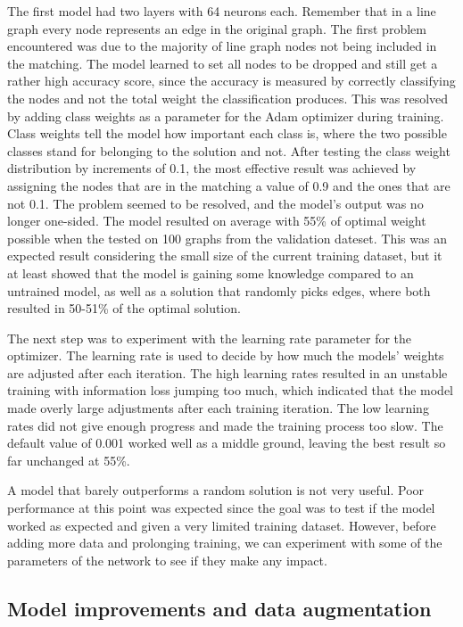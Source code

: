 The first model had two layers with 64 neurons each. Remember that in a line graph every node represents an edge in the original graph. The first problem encountered was due to the majority of line graph nodes not being included in the matching. The model learned to set all nodes to be dropped and still get a rather high accuracy score, since the accuracy is measured by correctly classifying the nodes and not the total weight the classification produces. This was resolved by adding class weights as a parameter for the Adam optimizer during training. Class weights tell the model how important each class is, where the two possible classes stand for belonging to the solution and not. After testing the class weight distribution by increments of 0.1, the most effective result was achieved by assigning the nodes that are in the matching a value of 0.9 and the ones that are not 0.1. The problem seemed to be resolved, and the model's output was no longer one-sided. The model resulted on average with 55\% of optimal weight possible when the tested on 100 graphs from the validation dateset. This was an expected result considering the small size of the current training dataset, but it at least showed that the model is gaining some knowledge compared to an untrained model, as well as a solution that randomly picks edges, where both resulted in 50-51\% of the optimal solution. 

The next step was to experiment with the learning rate parameter for the optimizer. The learning rate is used to decide by how much the models' weights are adjusted after each iteration. The high learning rates resulted in an unstable training with information loss jumping too much, which indicated that the model made overly large adjustments after each training iteration. The low learning rates did not give enough progress and made the training process too slow. The default value of 0.001 worked well as a middle ground, leaving the best result so far unchanged at 55\%.

A model that barely outperforms a random solution is not very useful. Poor performance at this point was expected since the goal was to test if the model worked as expected and given a very limited training dataset. However, before adding more data and prolonging training, we can experiment with some of the parameters of the network to see if they make any impact.

\subsection{Model improvements and data augmentation}

